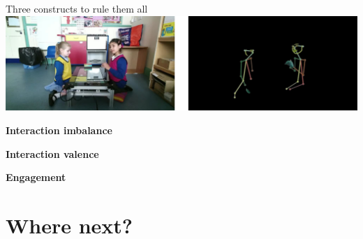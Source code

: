 \documentclass[xcolor=table]{beamer}
\begin{document}
\begin{frame}{Three constructs to rule them all}
        \centering
        \includegraphics[width=0.9\linewidth]{kinematics_social_dynamics/clips.jpg}

    \textbf{Interaction imbalance}
    
    \textbf{Interaction valence}
    
    \textbf{Engagement}

\end{frame}

%
%
%
%
%



\section{Where next?}
\end{document}
